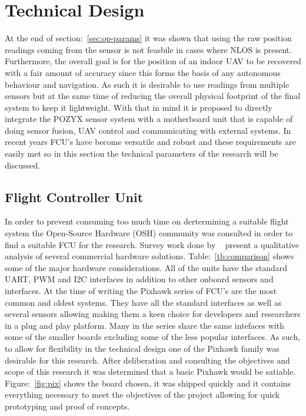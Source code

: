 \section{Technical Design}\label{sec:technical-design}
At the end of section:~\ref{sec:op-params} it was shown that using the raw position readings coming from the sensor is not feasbile in cases where NLOS is present.
Furthermore, the overall goal is for the position of an indoor UAV to be recovered with a fair amount of accuracy since this forms the basis of any autonomous behaviour and navigation.
As such it is desirable to use readings from multiple sensors but at the same time of reducing the overall physical footprint of the final system to keep it lightweight.
With that in mind it is proposed to directly integrate the POZYX sensor system with a motherboard unit that is capable of doing sensor fusion, UAV control and communicating with external systems.
In recent years FCU's have become versatile and robust and these requirements are easily met so in this section the technical parameters of the research will be discussed.

\subsection{Flight Controller Unit}\label{subsec:flight-controller-unit}
In order to prevent consuming too much time on dertermining a suitable flight system the Open-Source Hardware (OSH) community was consulted in order to find a suitable FCU for the research.
Survey work done by ~\citet{ebeid2018survey} present a qualitative analysis of several commercial hardware solutions.
Table:~\ref{tb:comparison} shows some of the major hardware considerations.
All of the units have the standard UART, PWM and I2C interfaces in addition to other onboard sensors and interfaces.
At the time of writing the Pixhawk series of FCU's are the most common and oldest systems.
They have all the standard interfaces as well as several sensors allowing making them a keen choice for developers and researchers in a plug and play platform.
Many in the series share the same intefaces with some of the smaller boards excluding some of the less popular interfaces.
As such, to allow for flexibility in the technical design one of the Pixhawk family was desirable for this research.
After deliberation and consulting the objectives and scope of this research it was determined that a basic Pixhawk would be satiable.
Figure:~\ref{fig:pix} shows the board chosen, it was shipped quickly and it contains everything necessary to meet the objectives of the project allowing for quick prototyping and proof of concepts.

